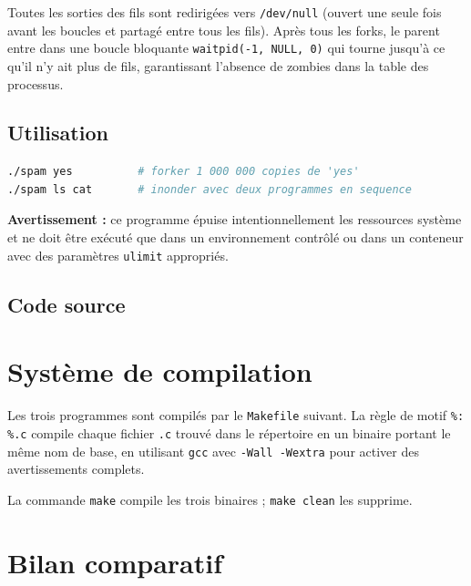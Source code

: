 \documentclass[12pt,a4paper]{article}
\begin{document}
Toutes les sorties des fils sont redirigées vers \texttt{/dev/null} (ouvert
une seule fois avant les boucles et partagé entre tous les fils). Après tous
les forks, le parent entre dans une boucle bloquante
\texttt{waitpid(-1, NULL, 0)} qui tourne jusqu'à ce qu'il n'y ait plus de
fils, garantissant l'absence de zombies dans la table des processus.

\subsection{Utilisation}

\begin{lstlisting}[language=bash, style=cstyle]
./spam yes          # forker 1 000 000 copies de 'yes'
./spam ls cat       # inonder avec deux programmes en sequence
\end{lstlisting}

\textbf{Avertissement :} ce programme épuise intentionnellement les ressources
système et ne doit être exécuté que dans un environnement contrôlé ou dans un
conteneur avec des paramètres \texttt{ulimit} appropriés.

\subsection{Code source}



\section{Système de compilation}

Les trois programmes sont compilés par le \texttt{Makefile} suivant. La règle
de motif \texttt{\%: \%.c} compile chaque fichier \texttt{.c} trouvé dans le
répertoire en un binaire portant le même nom de base, en utilisant \texttt{gcc}
avec \texttt{-Wall -Wextra} pour activer des avertissements complets.



La commande \texttt{make} compile les trois binaires ; \texttt{make clean}
les supprime.

\section{Bilan comparatif}
\end{document}
